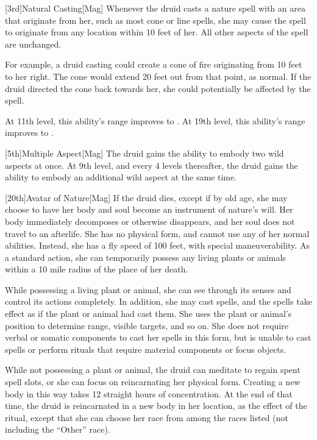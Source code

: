         [3rd]{Natural Casting}[Mag]
        Whenever the druid casts a nature spell with an area that originate from her, such as most cone or line spells, she may cause the spell to originate from any location within 10 feet of her.
        All other aspects of the spell are unchanged.

        For example, a druid casting  could create a cone of fire originating from 10 feet to her right.
        The cone would extend 20 feet out from that point, as normal.
        If the druid directed the cone back towards her, she could potentially be affected by the spell.

        At 11th level, this ability's range improves to \rngclose.
        At 19th level, this ability's range improves to \rngmed.

        [5th]{Multiple Aspect}[Mag]
        The druid gains the ability to embody two wild aspects at once.
        At 9th level, and every 4 levels thereafter, the druid gains the ability to embody an additional wild aspect at the same time.

    [20th]{Avatar of Nature}[Mag]
    If the druid dies, except if by old age, she may choose to have her body and soul become an instrument of nature's will.
    Her body immediately decomposes or otherwise disappears, and her soul does not travel to an afterlife.
    She has no physical form, and cannot use any of her normal abilities.
    Instead, she has a fly speed of 100 feet, with special maneuverability.
    As a standard action, she can temporarily possess any living plants or animals within a 10 mile radius of the place of her death.

    While possessing a living plant or animal, she can see through its senses and control its actions completely.
    In addition, she may cast spells, and the spells take effect as if the plant or animal had cast them.
    She uses the plant or animal's position to determine range, visible targets, and so on.
    She does not require verbal or somatic components to cast her spells in this form, but is unable to cast spells or perform rituals that require material components or focus objects.

    While not possessing a plant or animal, the druid can meditate to regain spent spell slots, or she can focus on reincarnating her physical form.
    Creating a new body in this way takes 12 straight hours of concentration.
    At the end of that time, the druid is reincarnated in a new body in her location, as the effect of the  ritual, except that she can choose her race from among the races listed (not including the ``Other'' race).

